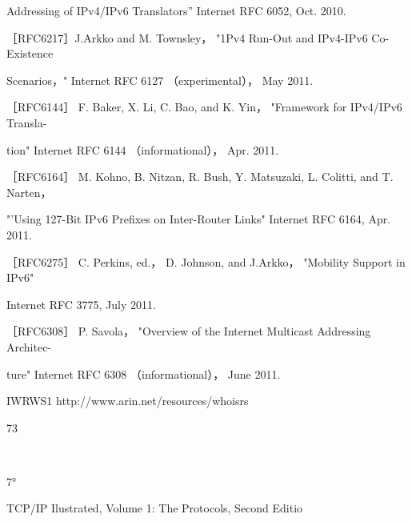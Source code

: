 Addressing of IPv4/IPv6 Translators” Internet RFC 6052, Oct. 2010.

［RFC6217］J.Arkko and M. Townsley， "1Pv4 Run-Out and IPv4-IPv6 Co-Existence

Scenarios，" Internet RFC 6127 （experimental）， May 2011.

［RFC6144］ F. Baker, X. Li, C. Bao, and K. Yin， "Framework for IPv4/IPv6 Transla-

tion" Internet RFC 6144 （informational）， Apr. 2011.

［RFC6164］ M. Kohno, B. Nitzan, R. Bush, Y. Matsuzaki, L. Colitti, and T. Narten，

"'Using 127-Bit IPv6 Prefixes on Inter-Router Links" Internet RFC 6164, Apr. 2011.

［RFC6275］ C. Perkins, ed.， D. Johnson, and J.Arkko， "Mobility Support in IPv6"

Internet RFC 3775, July 2011.

［RFC6308］ P. Savola， "Overview of the Internet Multicast Addressing Architec-

ture" Internet RFC 6308 （informational）， June 2011.

IWRWS1 http://www.arin.net/resources/whoisrs

73

~

7°

TCP/IP Ilustrated, Volume 1: The Protocols, Second Editio